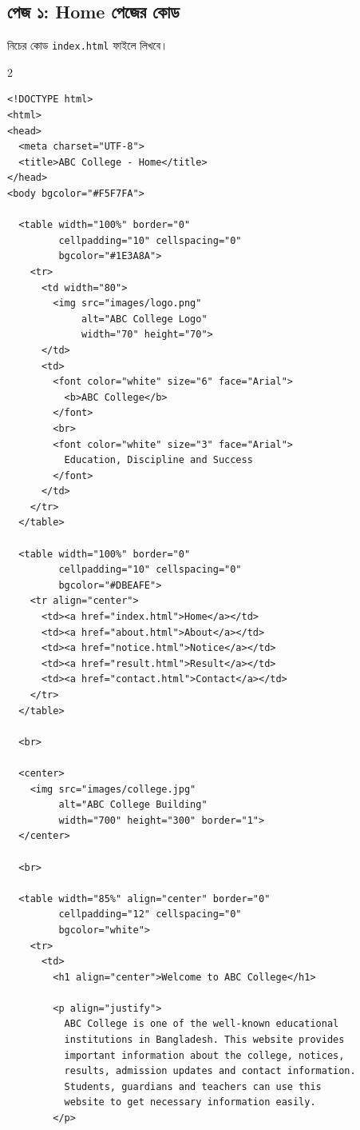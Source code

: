 \subsection{পেজ ১: Home পেজের কোড}

নিচের কোড \texttt{index.html} ফাইলে লিখবে।

\par{}\par
\begin{multicols}{2}
\begin{verbatim}
<!DOCTYPE html>
<html>
<head>
  <meta charset="UTF-8">
  <title>ABC College - Home</title>
</head>
<body bgcolor="#F5F7FA">

  <table width="100%" border="0"
         cellpadding="10" cellspacing="0"
         bgcolor="#1E3A8A">
    <tr>
      <td width="80">
        <img src="images/logo.png"
             alt="ABC College Logo"
             width="70" height="70">
      </td>
      <td>
        <font color="white" size="6" face="Arial">
          <b>ABC College</b>
        </font>
        <br>
        <font color="white" size="3" face="Arial">
          Education, Discipline and Success
        </font>
      </td>
    </tr>
  </table>

  <table width="100%" border="0"
         cellpadding="10" cellspacing="0"
         bgcolor="#DBEAFE">
    <tr align="center">
      <td><a href="index.html">Home</a></td>
      <td><a href="about.html">About</a></td>
      <td><a href="notice.html">Notice</a></td>
      <td><a href="result.html">Result</a></td>
      <td><a href="contact.html">Contact</a></td>
    </tr>
  </table>

  <br>

  <center>
    <img src="images/college.jpg"
         alt="ABC College Building"
         width="700" height="300" border="1">
  </center>

  <br>

  <table width="85%" align="center" border="0"
         cellpadding="12" cellspacing="0"
         bgcolor="white">
    <tr>
      <td>
        <h1 align="center">Welcome to ABC College</h1>

        <p align="justify">
          ABC College is one of the well-known educational
          institutions in Bangladesh. This website provides
          important information about the college, notices,
          results, admission updates and contact information.
          Students, guardians and teachers can use this
          website to get necessary information easily.
        </p>


\end{verbatim}
\end{multicols}
